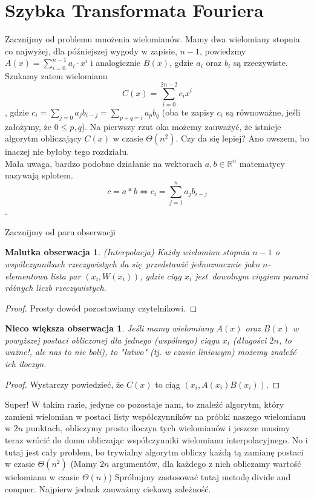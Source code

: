\section{Szybka Transformata Fouriera}

\newtheorem{observation_small}{Malutka obserwacja}
\newtheorem{observation_bigger}{Nieco większa obserwacja}


\label{sec:fft}

Zacznijmy od problemu mnożenia wielomianów. Mamy dwa wielomiany stopnia co najwyżej, dla późniejszej wygody w zapisie, $n-1$, powiedzmy $A(x) = \sum_{i=0}^{n-1} a_i\cdot x^i$ i analogicznie $B(x)$, gdzie $a_i$ oraz $b_i$ są rzeczywiste.
Szukamy zatem wielomianu $$C(x) = \sum_{i=0}^{2n-2} c_ix^i$$, gdzie $c_i = \sum_{j=0} a_jb_{i-j} = \sum_{p + q = i} a_pb_q $ (oba te zapisy $c_i$ są równoważne, jeśli założymy, że $ 0 \leq p,q$).
Na pierwszy rzut oka możemy zauważyć, że istnieje algorytm obliczający $C(x)$ w czasie $\Theta(n^2)$. Czy da się lepiej? Ano owszem, bo inaczej nie byłoby tego rozdziału.\\

    Mała uwaga, bardzo podobne działanie na wektorach $a,b\in \mathbb{R}^n$ matematycy nazywają splotem.
    $$c = a * b \Leftrightarrow c_i = \sum_{j=1}^{n}a_jb_{i-j}$$.

Zacznijmy od paru obserwacji
\begin{observation_small} (Interpolacja)
    Każdy wielomian stopnia $n-1$ o współczynnikach rzeczywistych da się przedstawić jednoznacznie jako $n$-elementowa lista par $(x_i, W(x_i))$, gdzie ciąg $x_i$ jest dowolnym ciągiem parami różnych liczb rzeczywistych.
\end{observation_small}
\begin{proof}
    Prosty dowód pozostawiamy czytelnikowi.
\end{proof}

\begin{observation_bigger}
    Jeśli mamy wielomiany $A(x)$ oraz $B(x)$ w powyższej postaci obliczonej dla jednego (wspólnego) ciągu $x_i$ (długości $2n$, to ważne!, ale nas to nie boli), to "łatwo" (tj. w czasie liniowym) możemy znaleźć ich iloczyn.
\end{observation_bigger}
\begin{proof}
    Wystarczy powiedzieć, że $C(x)$ to ciąg $(x_i, A(x_i)B(x_i))$.
\end{proof}
Super! W takim razie, jedyne co pozostaje nam, to znaleźć algorytm, który zamieni wielomian w postaci listy współczynników na próbki naszego wielomianu w $2n$ punktach, obliczymy prosto iloczyn tych wielomianów i jeszcze musimy teraz wrócić do domu obliczając współczynniki wielomianu interpolacyjnego.
No i tutaj jest cały problem, bo trywialny algorytm obliczy każdą tą zamianę postaci w czasie $\Theta(n^2)$ (Mamy $2n$ argumentów, dla każdego z nich obliczamy wartość wielomianu w czasie $\Theta(n)$)
Spróbujmy zastosować tutaj metodę divide and conquer. Najpierw jednak zauważmy ciekawą zależność.

